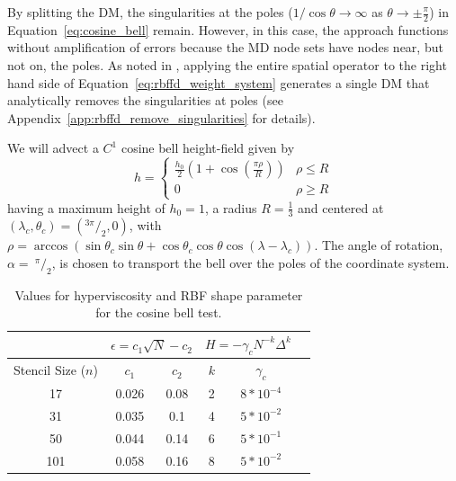 \documentclass{report}
\begin{document}
By splitting the DM, the singularities at the poles ($1 / \cos{\theta} \rightarrow \infty$ as $\theta \rightarrow \pm\frac{\pi}{2}$) in Equation~\ref{eq:cosine_bell} remain. However, in this case, the approach functions without amplification of errors because the MD node sets have nodes near, but not on, the poles. As noted in \cite{FlyerWright07, FornbergLehto11}, applying the entire spatial operator to the right hand side of Equation~\ref{eq:rbffd_weight_system} generates a single DM that analytically removes the singularities at poles (see Appendix~\ref{app:rbffd_remove_singularities} for details). 

We will advect a $C^1$ cosine bell height-field given by
\begin{equation*}
h  =
\begin{cases}
\frac{h_0}{2} (1 + \cos(\frac{\pi \rho}{R}))  & \rho \le R  \\
 0 &  \rho \geq R
\end{cases}
\end{equation*}
having a maximum height of $h_0 = 1$, a radius $R = \frac{1}{3}$ and centered at $(\lambda_c, \theta_c) = (^{3\pi}/_{2}, 0)$, with 
$\rho = \arccos( \sin \theta_{c} \sin \theta + \cos \theta_{c} \cos \theta \cos (\lambda - \lambda_{c}) )$.
The angle of rotation, $\alpha =\ ^{\pi}/_{2}$, is chosen to transport the bell over the poles of the coordinate system.

\begin{table}[ht!]
\caption{Values for hyperviscosity and RBF shape parameter for the cosine bell test. }
\begin{center}
\begin{tabular}{|c|c|c|c|c|c|}
\hline		     & \multicolumn{2}{c|}{$\epsilon = c_1 \sqrt{N} - c_2$} & \multicolumn{2}{c|}{$H = -\gamma_{c} N^{-k} \Delta^{k}$ } \\ \hline
Stencil Size ($n$) & $c_{1}$ & $c_{2}$ & $k$ & $\gamma_c$ \\ \hline
17 & 0.026 & 0.08 & 2 & $8 * 10^{-4}$ \\
31 & 0.035 & 0.1 & 4 & $5 * 10^{-2}$ \\
50 & 0.044 & 0.14 & 6 & $5 * 10^{-1}$ \\
101 & 0.058 & 0.16 & 8 & $5 * 10^{-2}$ \\ \hline
\end{tabular}
\end{center}
\label{tbl:cos_hv_params}
\end{table}
\end{document}
